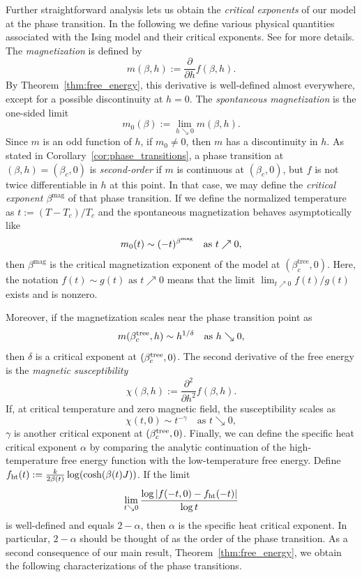 \documentclass{article}
\numberwithin{theorem}{section}
\theoremstyle{remark}
\begin{document}
Further straightforward analysis lets us obtain the \emph{critical exponents} of our model at the phase transition. In the following we define various physical quantities associated with the Ising model and their critical exponents. See \cite[\S 1]{baxter1982exactly} for more details. The \emph{magnetization} is defined by
\begin{equation}
  \label{eq:def_mag}
  m(\beta,h) := \frac{\partial}{\partial h} f(\beta,h).
\end{equation}
By Theorem~\ref{thm:free_energy}, this derivative is well-defined almost everywhere, except for a possible discontinuity at $h=0$. The \emph{spontaneous magnetization} is the one-sided limit
\[
  m_0(\beta) := \lim_{h \searrow 0} m(\beta,h).
\]
Since $m$ is an odd function of $h$, if $m_0\neq 0$, then $m$ has a discontinuity in $h$. As stated in Corollary~\ref{cor:phase_transitions}, a phase transition at $(\beta,h) = (\beta_c,0)$ is \emph{second-order} if $m$ is continuous at $ (\beta_c,0)$, but $f$ is not twice differentiable in $h$ at this point. In that case, we may define the \emph{critical exponent $\beta^\mathrm{mag}$} of that phase transition. If we define the normalized temperature as $t := (T -T_c)/T_c$ and the spontaneous magnetization behaves asymptotically like
\begin{equation}
  \label{eq:def_beta^{mag}}
  m_0(t) \sim (-t)^{\beta^\mathrm{mag}} \quad \text{as } t \nearrow 0,
\end{equation}
then 
$\beta^\mathrm{mag}$ is the critical magnetization exponent of the model at $(\beta_c^\mathrm{tree},0)$. Here, the notation $f(t) \sim g(t) \text{ as } t \nearrow 0$ means that the limit $\lim_{t\nearrow 0} f(t)/g(t)$ exists and is nonzero. \par
Moreover, if the magnetization scales near the phase transition point as
\[
  m(\beta_c^{\rm tree},h) \sim h^{1/\delta} \quad \text{as } h \searrow 0,
\]
then $\delta$ is a critical exponent at $(\beta_c^{\rm tree}, 0)$. The second derivative of the free energy is the \emph{magnetic susceptibility}
\begin{equation*}
  \chi(\beta,h) := \frac{\partial^2}{\partial h^2} f(\beta, h).
\end{equation*}
If, at critical temperature and zero magnetic field, the susceptibility scales as 
\[
  \chi(t, 0) \sim t^{-\gamma} \quad \text{as } t \searrow 0,
\]
$\gamma$ is another critical exponent at $(\beta_c^{\rm tree}, 0)$. Finally, we can define the specific heat critical exponent $\alpha$ by comparing the analytic continuation of the high-temperature free energy function with the low-temperature free energy. Define $f_{\rm ht}(t) := \frac{k}{2\beta(t)} \log(\cosh(\beta(t) J))$. If the limit
\begin{equation}
  \label{eq:singular_free_energy}
  \lim_{t \searrow 0} \frac{\log \left| f(-t,0) - f_{\rm ht}(-t) \right|}{\log t}
\end{equation}
is well-defined and equals $2-\alpha$, then $\alpha$ is the specific heat critical exponent. In particular, $2-\alpha$ should be thought of as the order of the phase transition. As a second consequence of our main result, Theorem~\ref{thm:free_energy}, we obtain the following characterizations of the phase transitions.
\end{document}
